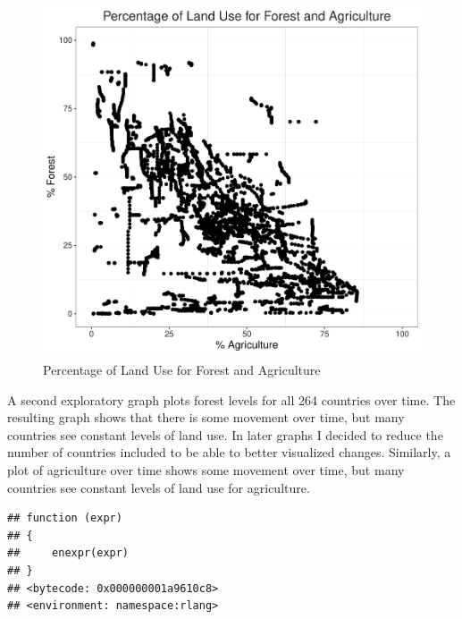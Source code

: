 \documentclass[12pt,]{article}
\begin{document}
\begin{figure}
\centering
\includegraphics{Marx_ENV872_Project_files/figure-latex/fig1-1.pdf}
\caption{\label{fig:fig1}Percentage of Land Use for Forest and
Agriculture}
\end{figure}

A second exploratory graph plots forest levels for all 264 countries
over time. The resulting graph shows that there is some movement over
time, but many countries see constant levels of land use. In later
graphs I decided to reduce the number of countries included to be able
to better visualized changes. Similarly, a plot of agriculture over time
shows some movement over time, but many countries see constant levels of
land use for agriculture.

\begin{verbatim}
## function (expr) 
## {
##     enexpr(expr)
## }
## <bytecode: 0x000000001a9610c8>
## <environment: namespace:rlang>
\end{verbatim}
\end{document}
